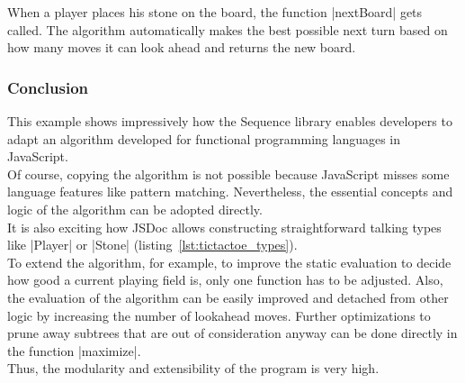 When a player places his stone on the board, the function |nextBoard| gets
called. The algorithm automatically makes the best possible next turn based on
how many moves it can look ahead and returns the new board.

\subsubsection{Conclusion} %
\label{subsub:ttt_conclusion}
This example shows impressively how the Sequence library enables developers to
adapt an algorithm developed for functional programming languages in
JavaScript.\\
Of course, copying the algorithm is not possible because JavaScript misses some
language features like pattern matching. Nevertheless, the essential concepts
and logic of the algorithm can be adopted directly. \\
It is also exciting how JSDoc allows constructing straightforward talking types
like |Player| or |Stone| (listing~\ref{lst:tictactoe_types}).\\
To extend the algorithm, for example, to improve the static evaluation to
decide how good a current playing field is, only one function has to be
adjusted. Also, the evaluation of the algorithm can be easily improved and
detached from other logic by increasing the number of lookahead moves. Further
optimizations to prune away subtrees that are out of consideration anyway can
be done directly in the function |maximize|.\\
Thus, the modularity and extensibility of the program is very high.
